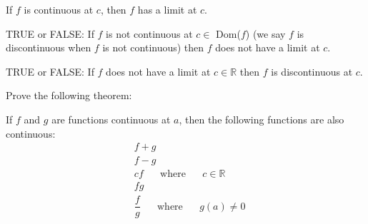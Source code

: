 \begin{theorem}
If $f$ is continuous at $c$, then $f$ has a limit at $c$.
\end{theorem}

\begin{exercise}
TRUE or FALSE: If $f$ is not continuous at $c \in$ Dom($f$) (we say $f$ is discontinuous when $f$ is not continuous) then $f$ does not have a limit at $c$.
\end{exercise}

\begin{exercise}
TRUE or FALSE: If $f$ does not have a limit at $c \in \mathbb{R}$  then $f$ is discontinuous at $c$.
\end{exercise}

\begin{exercise}
Prove the following theorem:
\begin{theorem}
If $f$ and $g$ are functions continuous at $a$, then the following functions are also continuous:
\begin{align*}
    &f + g\\[2ex]
    &f - g\\[2ex]
    &cf \hspace{20pt} \text{where} \hspace{20pt} c \in \mathbb{R}\\[2ex]
    &fg\\[2ex]
    &\dfrac{f}{g} \hspace{20pt} \text{where} \hspace{20pt} g(a) \neq 0
\end{align*}
\end{theorem}
\end{exercise}

